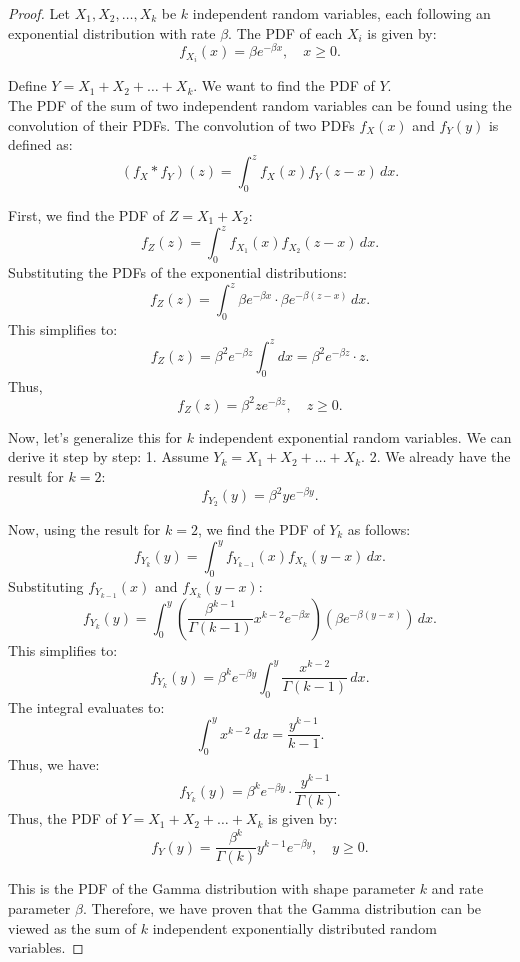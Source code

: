 \begin{proof}
    Let \(X_1, X_2, \ldots, X_k\) be \(k\) independent random variables, each following an exponential distribution with rate \(\beta\). The PDF of each \(X_i\) is given by:
\[
f_{X_i}(x) = \beta e^{-\beta x}, \quad x \geq 0.
\]

Define \(Y = X_1 + X_2 + \ldots + X_k\). We want to find the PDF of \(Y\).\\

The PDF of the sum of two independent random variables can be found using the convolution of their PDFs. The convolution of two PDFs \(f_X(x)\) and \(f_Y(y)\) is defined as:
\[
(f_X * f_Y)(z) = \int_0^z f_X(x) f_Y(z - x) \, dx.
\]

First, we find the PDF of \(Z = X_1 + X_2\):
\[
f_Z(z) = \int_0^z f_{X_1}(x) f_{X_2}(z - x) \, dx.
\]
Substituting the PDFs of the exponential distributions:
\[
f_Z(z) = \int_0^z \beta e^{-\beta x} \cdot \beta e^{-\beta (z - x)} \, dx.
\]
This simplifies to:
\[
f_Z(z) = \beta^2 e^{-\beta z} \int_0^z dx = \beta^2 e^{-\beta z} \cdot z.
\]
Thus,
\[
f_Z(z) = \beta^2 z e^{-\beta z}, \quad z \geq 0.
\]

Now, let's generalize this for \(k\) independent exponential random variables. We can derive it step by step:
1. Assume \(Y_k = X_1 + X_2 + \ldots + X_k\).
2. We already have the result for \(k=2\):
   \[
   f_{Y_2}(y) = \beta^2 y e^{-\beta y}.
   \]

Now, using the result for \(k=2\), we find the PDF of \(Y_k\) as follows:
\[
f_{Y_k}(y) = \int_0^y f_{Y_{k-1}}(x) f_{X_k}(y - x) \, dx.
\]
Substituting \(f_{Y_{k-1}}(x)\) and \(f_{X_k}(y - x)\):
\[
f_{Y_k}(y) = \int_0^y \left( \frac{\beta^{k-1}}{\Gamma(k-1)} x^{k-2} e^{-\beta x} \right) \left( \beta e^{-\beta (y - x)} \right) \, dx.
\]
This simplifies to:
\[
f_{Y_k}(y) = \beta^k e^{-\beta y} \int_0^y \frac{x^{k-2}}{\Gamma(k-1)} \, dx.
\]
The integral evaluates to:
\[
\int_0^y x^{k-2} \, dx = \frac{y^{k-1}}{k-1}.
\]
Thus, we have:
\[
f_{Y_k}(y) = \beta^k e^{-\beta y} \cdot \frac{y^{k-1}}{\Gamma(k)}.
\]
Thus, the PDF of \(Y = X_1 + X_2 + \ldots + X_k\) is given by:
\[
f_Y(y) = \frac{\beta^k}{\Gamma(k)} y^{k-1} e^{-\beta y}, \quad y \geq 0.
\]

This is the PDF of the Gamma distribution with shape parameter \(k\) and rate parameter \(\beta\). Therefore, we have proven that the Gamma distribution can be viewed as the sum of \(k\) independent exponentially distributed random variables.
\end{proof}

